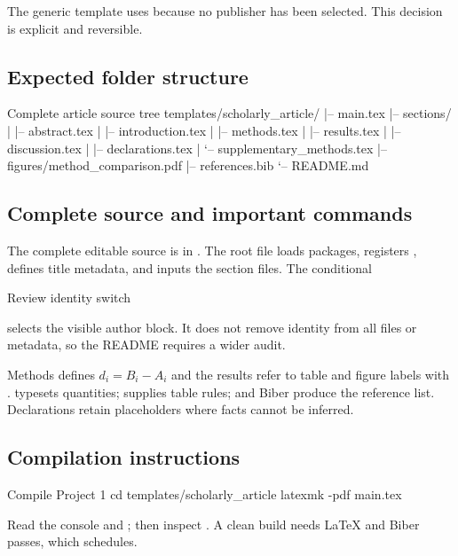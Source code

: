 The generic template uses  because no publisher has been selected.
This decision is explicit and reversible.

\subsection{Expected folder structure}

\begin{terminalcode}{Complete article source tree}
templates/scholarly_article/
|-- main.tex
|-- sections/
|   |-- abstract.tex
|   |-- introduction.tex
|   |-- methods.tex
|   |-- results.tex
|   |-- discussion.tex
|   |-- declarations.tex
|   `-- supplementary_methods.tex
|-- figures/method_comparison.pdf
|-- references.bib
`-- README.md
\end{terminalcode}

\subsection{Complete source and important commands}

The complete editable source is in
. The root file loads packages, registers
, defines title metadata, and inputs the section files. The
conditional

\begin{latexcode}{Review identity switch}
\newif\ifanonymous
\anonymousfalse
\end{latexcode}

selects the visible author block. It does not remove identity from all files or
metadata, so the README requires a wider audit.

Methods defines $d_i=B_i-A_i$ and the results refer to table and figure labels
with .  typesets quantities;  supplies table
rules;  and Biber produce the reference list. Declarations retain
placeholders where facts cannot be inferred.

\subsection{Compilation instructions}

\begin{terminalcode}{Compile Project 1}
cd templates/scholarly_article
latexmk -pdf main.tex
\end{terminalcode}

Read the console and ; then inspect . A clean build
needs \LaTeX{} and Biber passes, which  schedules.

